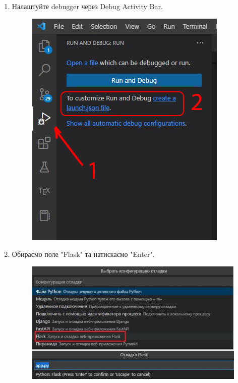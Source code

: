 \documentclass[a4paper,12pt]{article}
\begin{document}
\begin{enumerate}
\newpage
        \item Налаштуйте debugger через Debug Activity Bar.
        \begin{figure}[h!]
            \begin{center}
                \includegraphics[scale=0.7]{Prt sc/Figure_11.jpg}
            \end{center}
        \end{figure}
        \item Обираємо поле "Flask" та натискаємо "Enter".
        \begin{figure}[h!]
            \begin{center}
                \includegraphics[scale=0.7]{Prt sc/Figure_12.jpg}
            \end{center}
        \end{figure}


\end{enumerate}
\end{document}
